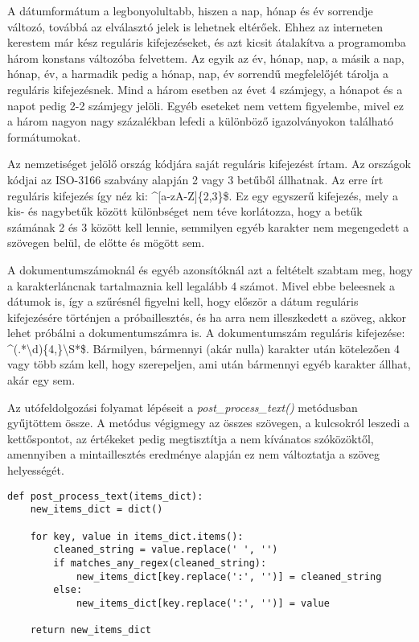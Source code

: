 \documentclass[12pt]{report}
\begin{document}
A dátumformátum a legbonyolultabb, hiszen a nap, hónap és év sorrendje változó, továbbá az elválasztó jelek is lehetnek eltérőek. Ehhez az interneten kerestem már kész reguláris kifejezéseket, és azt kicsit átalakítva a programomba három konstans változóba felvettem. Az egyik az év, hónap, nap, a másik a nap, hónap, év, a harmadik pedig a hónap, nap, év sorrendű megfelelőjét tárolja a reguláris kifejezésnek. Mind a három esetben az évet 4 számjegy, a hónapot és a napot pedig 2-2 számjegy jelöli. Egyéb eseteket nem vettem figyelembe, mivel ez a három nagyon nagy százalékban lefedi a különböző igazolványokon található formátumokat.

Az nemzetiséget jelölő ország kódjára saját reguláris kifejezést írtam. Az országok kódjai az ISO-3166 szabvány alapján 2 vagy 3 betűből állhatnak. Az erre írt reguláris kifejezés így néz ki: \textasciicircum[a-zA-Z]\{2,3\}\$. Ez egy egyszerű kifejezés, mely a kis- és nagybetűk között különbséget nem téve korlátozza, hogy a betűk számának 2 és 3 között kell lennie, semmilyen egyéb karakter nem megengedett a szövegen belül, de előtte és mögött sem.

A dokumentumszámoknál és egyéb azonsítóknál azt a feltételt szabtam meg, hogy a karakterláncnak tartalmaznia kell legalább 4 számot. Mivel ebbe beleesnek a dátumok is, így a szűrésnél figyelni kell, hogy először a dátum reguláris kifejezésére történjen a próbaillesztés, és ha arra nem illeszkedett a szöveg, akkor lehet próbálni a dokumentumszámra is. A dokumentumszám reguláris kifejezése: \textasciicircum(.*\textbackslash d)\{4,\}\textbackslash S*\$. Bármilyen, bármennyi (akár nulla) karakter után kötelezően 4 vagy több szám kell, hogy szerepeljen, ami után bármennyi egyéb karakter állhat, akár egy sem.

Az utófeldolgozási folyamat lépéseit a \emph{post\_process\_text()} metódusban gyűjtöttem össze. A metódus végigmegy az összes szövegen, a kulcsokról leszedi a kettőspontot, az értékeket pedig megtisztítja a nem kívánatos szóközöktől, amennyiben a mintaillesztés eredménye alapján ez nem változtatja a szöveg helyességét.

\begin{verbatim}
def post_process_text(items_dict):
    new_items_dict = dict()

    for key, value in items_dict.items():
        cleaned_string = value.replace(' ', '')
        if matches_any_regex(cleaned_string):
            new_items_dict[key.replace(':', '')] = cleaned_string
        else:
            new_items_dict[key.replace(':', '')] = value

    return new_items_dict
\end{verbatim}
\end{document}
